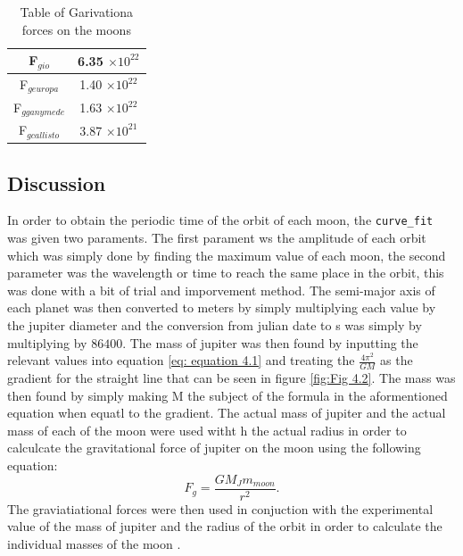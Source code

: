 \documentclass[12pt, a4paper]{article}
\begin{document}
\begin{table}[H]
    \centering
    \begin{tabular}{|c|c|}
    \hline
    F\(_{g io}\) & 6.35 \(\times 10^{22}\) \\ \hline
    F\(_{g europa}\) & 1.40 \(\times 10^{22}\) \\ \hline
    F\(_{g ganymede}\) & 1.63 \(\times 10^{22}\) \\ \hline
    F\(_{g callisto}\) & 3.87 \(\times 10^{21}\) \\ \hline
    \end{tabular}
    \caption{Table of Garivationa forces on the moons}
    \label{tab: Table 4.3}
\end{table}

\subsection{Discussion}
In order to obtain the periodic time of the orbit of each moon, the \texttt{curve_fit} was given two paraments. The first parament ws the amplitude of each orbit which was simply done by finding the maximum value of each moon, the second parameter was the wavelength or time to reach the same place in the orbit, this was done with a bit of trial and imporvement method. The semi-major axis of each planet was then converted to meters by simply multiplying each value by the jupiter diameter and the conversion from julian date to s was simply by multiplying by \(86400\). The mass of jupiter was then found by inputting the relevant values into equation \ref{eq: equation 4.1} and treating the \(\frac{4\pi^2}{GM}\) as the gradient for the straight line that can be seen in figure \ref{fig:Fig 4.2}. The mass was then found by simply making M the subject of the formula in the aformentioned equation when equatl to the gradient. The actual mass of jupiter and the actual mass of each of the moon were used witht h the actual radius in order to calculcate the gravitational force of jupiter on the moon using the following equation:
\begin{equation}
    F_g = \frac{GM_Jm_{moon}}{r^2} .
\end{equation}
The graviatiational forces were then used in conjuction with the experimental value of the mass of jupiter and the radius of the orbit in order to calculate the individual masses of the moon \parencite{muncaster}. 
\end{document}
